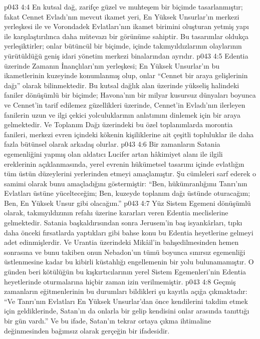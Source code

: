 \vs p043 4:4 En kutsal dağ, zarifçe güzel ve muhteşem bir biçimde tasarlanmıştır; fakat Cennet Evladı’nın mevcut ikamet yeri, En Yüksek Unsurlar’ın merkezi yerleşkesi ile ve Vorondadek Evlatları’nın ikamet birimini oluşturan yetmiş yapı ile karşılaştırılınca daha mütevazı bir görünüme sahiptir. Bu tasarımlar oldukça yerleşiktirler; onlar bütüncül bir biçimde, içinde takımyıldızlarının olaylarının yürütüldüğü geniş idari yönetim merkezi binalarından ayrıdır.
\vs p043 4:5 Edentia üzerinde Zamanın İnançlıları’nın yerleşkesi; En Yüksek Unsurlar’ın bu ikametlerinin kuzeyinde konumlanmış olup, onlar “Cennet bir araya gelişlerinin dağı” olarak bilinmektedir. Bu kutsal dağlık alan üzerinde yükseliş halindeki faniler dönüşümlü bir biçimde; Havona’nın bir milyar kusursuz dünyaları boyunca ve Cennet’in tarif edilemez güzellikleri üzerinde, Cennet’in Evladı’nın ilerleyen fanilerin uzun ve ilgi çekici yolculuklarının anlatımını dinlemek için bir araya gelmektedir. Ve Toplanım Dağı üzerindeki bu özel toplanımlarda morontia fanileri, merkezi evren içindeki kökenin kişiliklerine ait çeşitli topluluklar ile daha fazla bütünsel olarak arkadaş olurlar.
\vs p043 4:6 Bir zamanların Satania egemenliğini yapmış olan aldatıcı Lucifer artan hâkimiyet alanı ile ilgili ereklerinin açıklanmasında, yerel evrenin hükümetsel tasarımı içinde evlatlığın tüm üstün düzeylerini yerlerinden etmeyi amaçlamıştır. Şu cümleleri sarf ederek o samimi olarak bunu amaçladığını göstermiştir: “Ben, hükümranlığımı Tanrı’nın Evlatları üstüne yücelteceğim; Ben, kuzeyde toplanım dağı üstünde oturacağım; Ben, En Yüksek Unsur gibi olacağım.”
\vs p043 4:7 Yüz Sistem Egemeni dönüşümlü olarak, takımyıldızının refahı üzerine kararları veren Edentia meclislerine gelmektedir. Satania başkaldırısından sonra Jerusem’in baş isyankârları, tıpkı daha önceki fırsatlarda yaptıkları gibi bahse konu bu Edentia heyetlerine gelmeyi adet edinmişlerdir. Ve Urantia üzerindeki Mikâil’in bahşedilmesinden hemen sonrasına ve bunu takiben onun Nebadon’un tümü boyunca sınırsız egemenliği üstlenmesine kadar bu kibirli küstahlığı engellemenin bir yolu bulunamamıştır. O günden beri kötülüğün bu kışkırtıcılarının yerel Sistem Egemenleri’nin Edentia heyetlerinde oturmalarına hiçbir zaman izin verilmemiştir.
\vs p043 4:8 Geçmiş zamanların eğitmenlerinin bu durumları bildikleri şu kayıtla açığa çıkmaktadır: “Ve Tanrı’nın Evlatları En Yüksek Unsurlar’dan önce kendilerini takdim etmek için geldiklerinde, Satan’ın da onlarla bir gelip kendisini onlar arasında tanıttığı bir gün vardı.” Ve bu ifade, Satan’ın tekrar ortaya çıkma ihtimaline değinmesinden bağımsız olarak gerçeğin bir ifadesidir.
